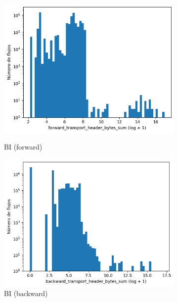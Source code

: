 \begin{figure}[H]
\begin{subfigure}[b]{0.26\textwidth}
        \includegraphics[width=\linewidth]{media/packet_pincer_botiot/forward_transport_header_bytes_sum_log_x_log_y.png}
        \caption{BI (forward)}
        \includegraphics[width=\linewidth]{media/packet_pincer_botiot/backward_transport_header_bytes_sum_log_x_log_y.png}
        \caption{BI (backward)}
    \end{subfigure}
    \hfill
    \begin{subfigure}[b]{0.26\textwidth}
        \centering

\end{subfigure}
\end{figure}
